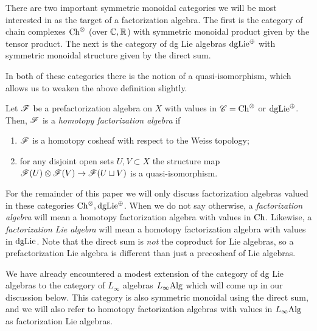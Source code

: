 There are two important symmetric monoidal categories we will be most interested in as the target of a factorization algebra.
The first is the category of chain complexes ${\rm Ch}^{\otimes}$ (over $\mathbb C, \mathbb R$) with symmetric monoidal product given by the tensor product.
The next is the category of dg Lie algebras ${\rm dgLie}^{\oplus}$ with symmetric monoidal structure given by the direct sum.

In both of these categories there is the notion of a quasi-isomorphism, which allows us to weaken the above definition slightly.  

\begin{dfn} 
Let $\mathscr F$ be a prefactorization algebra on $X$ with values in $\mathscr C = {\rm Ch}^{\otimes}$ or ${\rm dgLie}^{\oplus}$. 
Then, $\mathscr F$ is a {\em homotopy factorization algebra} if
\begin{enumerate}
\item $\mathscr F$ is a homotopy cosheaf with respect to the Weiss topology;
\item for any disjoint open sets $U, V \subset X$ the structure map $\mathscr F(U) \otimes \mathscr F(V) \to \mathscr F(U \sqcup V)$ is a quasi-isomorphism.
\end{enumerate}
\end{dfn}


For the remainder of this paper we will only discuss factorization algebras valued in these categories ${\rm Ch}^\otimes, {\rm dgLie}^{\oplus}$.
When we do not say otherwise, a {\em factorization algebra} will mean a homotopy factorization algebra with values in ${\rm Ch}$. 
Likewise, a {\em factorization Lie algebra} will mean a homotopy factorization algebra with values in ${\rm dgLie}$. 
Note that the direct sum is {\em not} the coproduct for Lie algebras, so a prefactorization Lie algebra is different than just a precosheaf of Lie algebras. 

We have already encountered a modest extension of the category of dg Lie algebras to the category of $L_\infty$ algebras $L_\infty{\rm Alg}$ which will come up in our discussion below.
This category is also symmetric monoidal using the direct sum, and we will also refer to homotopy factorization algebras with values in $L_\infty{\rm Alg}$ as factorization Lie algebras.

